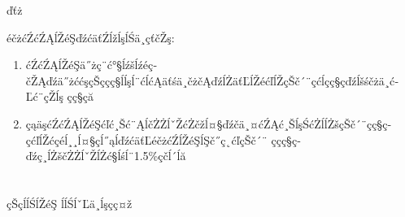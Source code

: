 ďťż\documentclass[10.5pt]{article}
\begin{document}
éčżćŹćŹĄĺŽéŞďźćäťŹĺžĺşĺŚä¸çťčŽş:
\begin{enumerate}
\item ćŹćŹĄĺŽéŞä˝żç¨ć°§ĺźšĺźéç­čŽĄďźä˝żććşçŠççç§ĺĺşĺ¨ćĺćĄäťśä¸čżčĄďźĺŻäťĽĺŽéćľĺŽçŠč´¨çćĺçç§ç­ďźĺšśčżä¸ć­Ľć¨çŽĺş
çç§çă
\item çąäşćŹćŹĄĺŽéŞćľć¸Šć¨ĄĺčŻŻĺˇŽćŻčžĺ¤§ďźčä¸¤ćŹĄć¸ŠĺşŚćŻĺĺŻšçŠč´¨çç§ç­çćľĺŽćçéĺ¸¸ĺ¤§çĺ˝ąĺďźćäťĽéčżćŹĺŽéŞĺŞč˝ç˛ćľçŠč´¨
ççç§ç­ďźç¸ĺŻščŻŻĺˇŽĺŻć§ĺśĺ¨1.5\%çčĺ´ĺă
\end{enumerate}

\section{\textbf{}}
\begin{thebibliography}{}
çŠçĺĺ­ŚĺŽéŞ \quad ĺĺ­ŚĺˇĽä¸ĺşçç¤ž
\end{thebibliography}
\end{document}
